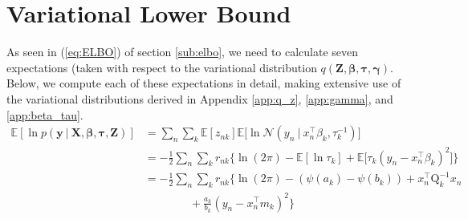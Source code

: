 \documentclass[twoside,11pt]{article}
\newcommand\given[1][]{\:#1\vert\:}
\newcommand{\transpose}[1]{#1^{\intercal}}
\newcommand{\nsum}{\sum\limits_{n}}
\newcommand{\ksum}{\sum\limits_{k}}
\newcommand{\boldbeta}{\boldsymbol\beta}
\newcommand{\boldgamma}{\boldsymbol\gamma}
\newcommand{\boldtau}{\boldsymbol\tau}
\newcommand{\E}{\mathbb{E}}
\newcommand{\pr}[1]{p \left( #1 \right)}
\begin{document}
\section{Variational Lower Bound} \label{app:elbo}  %
As seen in (\ref{eq:ELBO}) of section \ref{sub:elbo}, we need to calculate seven expectations (taken with respect to the variational distribution $q(\mathbf{Z}, \boldbeta, \boldtau, \boldgamma)$. Below, we compute each of these expectations in detail, making extensive use of the variational distributions derived in Appendix \ref{app:q_z}, \ref{app:gamma}, and \ref{app:beta_tau}. 
\begin{equation} \label{eq:e1_deriv}
\begin{split}
	\E[\ln\pr{\mathbf{y} \given \mathbf{X}, \boldbeta, \boldtau, \mathbf{Z}}] &= \nsum \ksum \E[z_{nk}] \E \Bigg[ \ln \mathcal{N}\left(y_n \given \transpose{x_n} \beta_k, \tau_k^{-1}\right)\Bigg]  \\
	&= -\frac{1}{2} \nsum \ksum r_{nk} \Big\{ \ln(2 \pi) - \E[\ln \tau_k] + \E\Big[\tau_k \left( y_n - \transpose{x_n} \beta_k\right)^2\Big]\Big\} \\
	&= -\frac{1}{2}\nsum \ksum r_{nk} \Big\{ \ln (2\pi) - (\psi(a_k) - \psi(b_k)) + \transpose{x_n}\mathrm{Q}_k^{-1}x_n \\ & \qquad \qquad + \frac{a_k}{b_k}(y_n - \transpose{x_n}m_k)^2 \Big\}
\end{split}
\end{equation}
\end{document}
